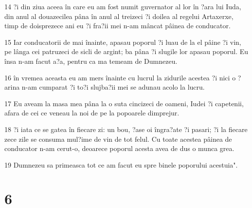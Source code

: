 \par 14 ?i din ziua aceea în care eu am fost numit guvernator al lor în ?ara lui Iuda, din anul al douazecilea pâna în anul al treizeci ?i doilea al regelui Artaxerxe, timp de doisprezece ani eu ?i fra?ii mei n-am mâncat pâinea de conducator.
\par 15 Iar conducatorii de mai înainte, apasau poporul ?i luau de la el pâine ?i vin, pe lânga cei patruzeci de sicli de argint; ba pâna ?i slugile lor apasau poporul. Eu însa n-am facut a?a, pentru ca ma temeam de Dumnezeu.
\par 16 în vremea aceasta eu am mers înainte cu lucrul la zidurile acestea ?i nici o ?arina n-am cumparat ?i to?i slujba?ii mei se adunau acolo la lucru.
\par 17 Eu aveam la masa mea pâna la o suta cincizeci de oameni, Iudei ?i capetenii, afara de cei ce veneau la noi de pe la popoarele dimprejur.
\par 18 ?i iata ce se gatea în fiecare zi: un bou, ?ase oi îngra?ate ?i pasari; ?i la fiecare zece zile se consuma mul?ime de vin de tot felul. Cu toate acestea pâinea de conducator n-am cerut-o, deoarece poporul acesta avea de dus o munca grea.
\par 19 Dumnezeu sa primeasca tot ce am facut eu spre binele poporului acestuia".

\chapter{6}

